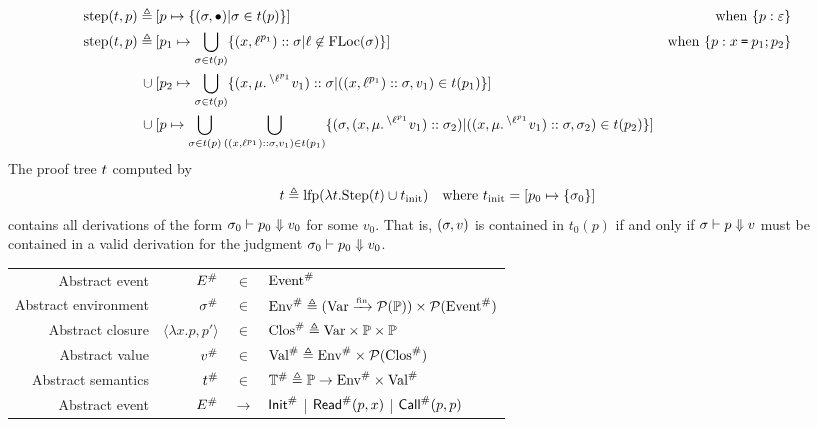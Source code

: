 \documentclass{article}
\begin{document}
\begin{align*}
	\text{step}(t,p) \triangleq & \: [p\mapsto\{(\sigma,\bullet)|\sigma\in t(p)\}]                                                                                                                                                                                                 & \text{when }\{{p}:{\varepsilon}\}                              \\
	\text{step}(t,p) \triangleq & \: [p_1\mapsto\bigcup_{\sigma\in t(p)}\{(x,{\ell}^{p_1})::\sigma|\ell\not\in\text{FLoc}(\sigma)\}]                                                                                                                                               & \text{when }\{{p}:{x\:\texttt{=}\:p_1;p_2}\}                   \\
	\cup                       & \: [p_2\mapsto\bigcup_{\sigma\in t(p)}\{(x,\mu.\prescript{\backslash{{\ell}^{p_1}}}{}{v_1})::\sigma|((x,{\ell}^{p_1})::\sigma,v_1)\in t(p_1)\}]                                                                                                                                                                \\
	\cup                       & \: [p\mapsto\bigcup_{\sigma\in t(p)}\bigcup_{((x,{\ell}^{p_1})::\sigma,v_1)\in t(p_1)}\{(\sigma,(x,\mu.\prescript{\backslash{{\ell}^{p_1}}}{}{v_1})::\sigma_2)|((x,\mu.\prescript{\backslash{{\ell}^{p_1}}}{}{v_1})::\sigma,\sigma_2)\in t(p_2)\}]
\end{align*}
The proof tree $t$ computed by
\[t\triangleq\text{lfp}(\lambda t.\text{Step}(t)\cup t_{\text{init}})\quad\text{where }t_{\text{init}}=[p_0\mapsto\{\sigma_0\}]\]
contains all derivations of the form ${\sigma_0}\vdash{p_0}\Downarrow{v_0}$ for some $v_0$.
That is, $(\sigma,v)$ is contained in $t_0(p)$ if and only if ${\sigma}\vdash{p}\Downarrow{v}$ must be contained in a valid derivation for the judgment ${\sigma_0}\vdash{p_0}\Downarrow{v_0}$.
\begin{center}
	\begin{tabular}{rrcl}
		Abstract event       & ${E}^{\#}$                 & $\in$         & ${\text{Event}}^{\#}$                                                                     \\
		Abstract environment & ${\sigma}^{\#}$                   & $\in$         & ${\text{Env}}^{\#}\triangleq({\text{Var}}\xrightarrow{\mbox{\tiny{fin}}}{\mathcal{P}(\mathbb{P})})\times\mathcal{P}({\text{Event}}^{\#})$ \\
		Abstract closure     & $\langle\lambda x.p,p'\rangle$ & $\in$         & ${\text{Clos}}^{\#}\triangleq\text{Var}\times\mathbb{P}\times\mathbb{P}$              \\
		Abstract value       & ${v}^{\#}$                      & $\in$         & ${\text{Val}}^{\#}\triangleq{\text{Env}}^{\#}\times\mathcal{P}({\text{Clos}}^{\#})$                   \\
		Abstract semantics   & ${t}^{\#}$                   & $\in$         & ${\mathbb{T}}^{\#}\triangleq\mathbb{P}\rightarrow{\text{Env}}^{\#}\times{\text{Val}}^{\#}$      \\
		Abstract event       & ${E}^{\#}$                 & $\rightarrow$ & ${\textsf{Init}}^{\#}$ | ${\textsf{Read}}^{\#}(p,x)$ | ${\textsf{Call}}^{\#}(p,p)$
	\end{tabular}
\end{center}
\end{document}
